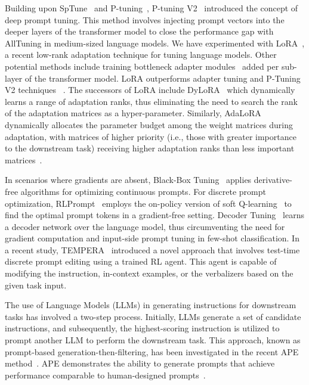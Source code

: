 \documentclass[11pt]{article}
\begin{document}
Building upon SpTune~\cite{lester-etal-2021-power} and P-tuning~\cite{li-liang-2021-prefix}, P-tuning V2~\cite{liu-etal-2022-p} introduced the concept of deep prompt tuning. This method involves injecting prompt vectors into the deeper layers of the transformer model to close the performance gap with AllTuning in medium-sized language models. We have experimented with LoRA~\cite{DBLP:journals/corr/abs-2106-09685}, a recent low-rank adaptation technique for tuning language models. Other potential methods include training bottleneck adapter modules~\cite{DBLP:journals/corr/abs-1902-00751, lin-etal-2020-exploring} added per sub-layer of the transformer model. LoRA outperforms adapter tuning and P-Tuning V2 techniques ~\cite{DBLP:journals/corr/abs-2106-09685}. The successors of LoRA include DyLoRA~\cite{valipour-etal-2023-dylora}  which dynamically learns a range of adaptation ranks, thus eliminating the need to search the rank of the adaptation matrices as a hyper-parameter. Similarly, AdaLoRA dynamically allocates the parameter budget among the weight matrices during adaptation, with matrices of higher priority (i.e., those with greater importance to the downstream task) receiving higher adaptation ranks than less important matrices~\cite{zhang2023adaptive}.

In scenarios where gradients are absent, Black-Box Tuning~\cite{DBLP:journals/corr/abs-2201-03514} applies derivative-free algorithms for optimizing continuous prompts. For discrete prompt optimization, RLPrompt~\cite{deng-etal-2022-rlprompt} employs the on-policy version of soft Q-learning~\cite{https://doi.org/10.48550/arxiv.2106.07704} to find the optimal prompt tokens in a gradient-free setting. Decoder Tuning~\cite{cui-etal-2023-decoder} learns a decoder network over the language model, thus circumventing the need for gradient computation and input-side prompt tuning in few-shot classification. In a recent study, TEMPERA~\cite{zhang2022tempera} introduced a novel approach that involves test-time discrete prompt editing using a trained RL agent. This agent is capable of modifying the instruction, in-context examples, or the verbalizers based on the given task input.

The use of Language Models (LLMs) in generating instructions for downstream tasks has involved a two-step process. Initially, LLMs generate a set of candidate instructions, and subsequently, the highest-scoring instruction is utilized to prompt another LLM to perform the downstream task. This approach, known as prompt-based generation-then-filtering, has been investigated in the recent APE method~\cite{zhou2023large}. APE demonstrates the ability to generate prompts that achieve performance comparable to human-designed prompts~\cite{zhou2023large}.
\end{document}
